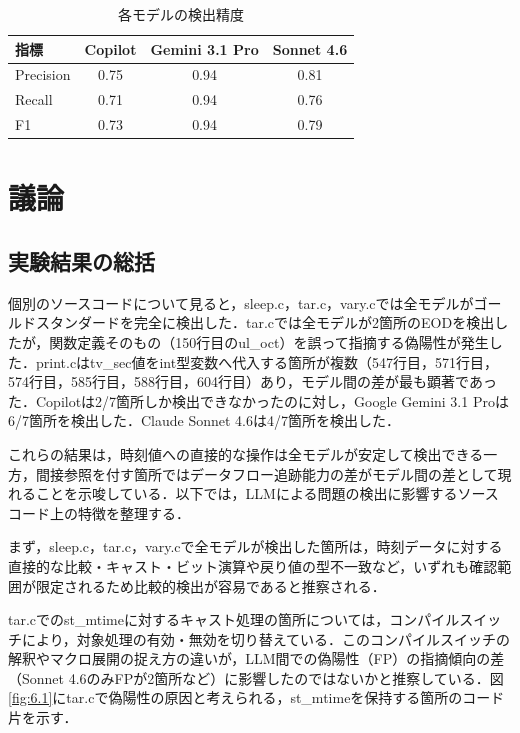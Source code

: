 \documentclass[submit,techrep,noauthor]{ipsj-lualatex}
\begin{document}
\begin{table}[bt]
	\centering
	\caption{各モデルの検出精度}
	\label{tab:5.2}
	\begin{tabular}{|l|c|c|c|}
\hline
\textbf{指標} & \textbf{Copilot} & \textbf{Gemini 3.1 Pro} & \textbf{Sonnet 4.6} \\
\hline
Precision & 0.75 & 0.94 & 0.81 \\
\hline
Recall    & 0.71 & 0.94 & 0.76 \\
\hline
F1        & 0.73 & 0.94 & 0.79 \\
\hline
\end{tabular}
\end{table}

\section{議論}

\subsection{実験結果の総括}

個別のソースコードについて見ると，sleep.c，tar.c，vary.cでは全モデルがゴールドスタンダードを完全に検出した．tar.cでは全モデルが2箇所のEODを検出したが，関数定義そのもの（150行目のul\_oct）を誤って指摘する偽陽性が発生した．print.cはtv\_sec値をint型変数へ代入する箇所が複数（547行目，571行目，574行目，585行目，588行目，604行目）あり，モデル間の差が最も顕著であった．Copilotは2/7箇所しか検出できなかったのに対し，Google Gemini 3.1 Proは6/7箇所を検出した．Claude Sonnet 4.6は4/7箇所を検出した．

これらの結果は，時刻値への直接的な操作は全モデルが安定して検出できる一方，間接参照を付す箇所ではデータフロー追跡能力の差がモデル間の差として現れることを示唆している．以下では，LLMによる問題の検出に影響するソースコード上の特徴を整理する．

まず，sleep.c，tar.c，vary.cで全モデルが検出した箇所は，時刻データに対する直接的な比較・キャスト・ビット演算や戻り値の型不一致など，いずれも確認範囲が限定されるため比較的検出が容易であると推察される．

tar.cでのst\_mtimeに対するキャスト処理の箇所については，コンパイルスイッチにより，対象処理の有効・無効を切り替えている．このコンパイルスイッチの解釈やマクロ展開の捉え方の違いが，LLM間での偽陽性（FP）の指摘傾向の差（Sonnet 4.6のみFPが2箇所など）に影響したのではないかと推察している．図\ref{fig:6.1}にtar.cで偽陽性の原因と考えられる，st\_mtimeを保持する箇所のコード片を示す．
\end{document}
